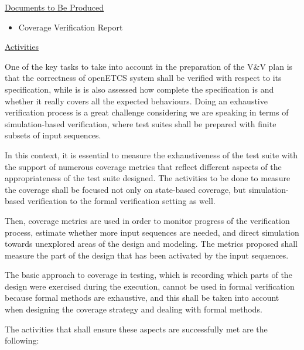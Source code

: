 \documentclass{template/openetcs_report}
\begin{document}
\underline{Documents to Be Produced} 

\begin{itemize}
\item Coverage Verification Report
\end{itemize}

\underline{Activities}

One of the key tasks to take into account in the preparation of the V\&V plan is that the correctness of openETCS system shall be verified with respect to its specification, while is is also assessed how complete the specification is and whether it really covers all the expected behaviours. 
Doing an exhaustive verification process is a great challenge considering we are speaking in terms of simulation-based verification, where test suites shall be prepared with finite subsets of input sequences.

In this context, it is essential to measure the exhaustiveness of the test suite with the support of numerous coverage metrics that reflect different aspects of the appropriateness of the test suite designed. The activities to be done to measure the coverage shall be focused not only on state-based coverage, but simulation-based verification to the formal verification setting as well.

Then, coverage metrics are used in order to monitor progress of the verification process, estimate whether more input sequences are needed, and direct simulation towards unexplored areas of the design and modeling. The metrics proposed shall measure the part of the design that has been activated by the input sequences. 

The basic approach to coverage in testing, which is recording which parts of the design were exercised during the execution, cannot be used in formal verification because formal methods are exhaustive, and this shall be taken into account when designing the coverage strategy and dealing with formal methods. 

The activities that shall ensure these aspects are successfully met are the following:
\end{document}
